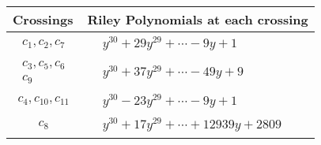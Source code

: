 \documentclass[1p]{elsarticle_modified}
\theoremstyle{definition}
\begin{document}
\begin{tabular}{m{50pt}|m{274pt}}
Crossings & \hspace{64pt}Riley Polynomials at each crossing \\
\hline $$\begin{aligned}c_{1},c_{2},c_{7}\end{aligned}$$&$\begin{aligned}
&y^{30}+29 y^{29}+\cdots-9 y+1
\end{aligned}$\\
\hline $$\begin{aligned}c_{3},c_{5},c_{6}\\c_{9}\end{aligned}$$&$\begin{aligned}
&y^{30}+37 y^{29}+\cdots-49 y+9
\end{aligned}$\\
\hline $$\begin{aligned}c_{4},c_{10},c_{11}\end{aligned}$$&$\begin{aligned}
&y^{30}-23 y^{29}+\cdots-9 y+1
\end{aligned}$\\
\hline $$\begin{aligned}c_{8}\end{aligned}$$&$\begin{aligned}
&y^{30}+17 y^{29}+\cdots+12939 y+2809
\end{aligned}$\\
\hline
\end{tabular}
\vskip 2pc
\end{document}
